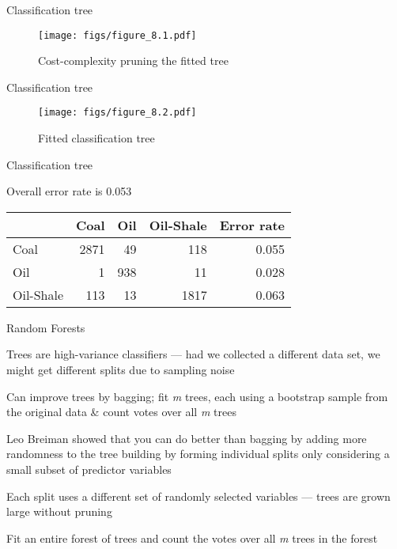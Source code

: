 \documentclass[11pt,ignorenonframetext,compress, aspectratio=169]{beamer}
\begin{document}
\begin{frame}{Classification tree}

\begin{figure}[htbp]
\centering
\texttt{[image: figs/figure\_8.1.pdf]}
\caption{Cost-complexity pruning the fitted tree}
\end{figure}

\end{frame}

\begin{frame}{Classification tree}

\begin{figure}[htbp]
\centering
\texttt{[image: figs/figure\_8.2.pdf]}
\caption{Fitted classification tree}
\end{figure}

\end{frame}

\begin{frame}{Classification tree}

Overall error rate is 0.053

\begin{longtable}[]{@{}lrrrr@{}}
\toprule
& Coal & Oil & Oil-Shale & Error rate\tabularnewline
\midrule
\endhead
Coal & 2871 & 49 & 118 & 0.055\tabularnewline
Oil & 1 & 938 & 11 & 0.028\tabularnewline
Oil-Shale & 113 & 13 & 1817 & 0.063\tabularnewline
\bottomrule
\end{longtable}

\end{frame}

\begin{frame}{Random Forests}

Trees are high-variance classifiers --- had we collected a different
data set, we might get different splits due to sampling noise

Can improve trees by \alert{bagging}; fit \emph{m} trees, each using a
bootstrap sample from the original data \& count votes over all \emph{m}
trees

Leo Breiman showed that you can do better than bagging by adding more
randomness to the tree building by forming individual splits only
considering a small subset of predictor variables

Each split uses a different set of randomly selected variables --- trees
are grown large without pruning

Fit an entire forest of trees and count the votes over all \emph{m}
trees in the forest

\end{frame}
\end{document}
